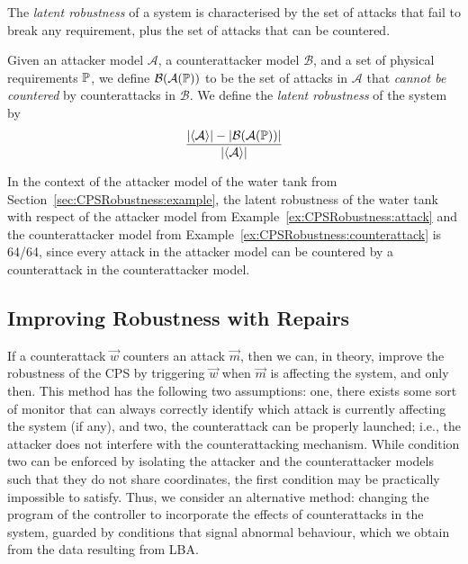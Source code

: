 {{The \emph{latent robustness} of a system is characterised by the set of attacks that fail to break any requirement, plus the set of attacks that can be countered.
\begin{definition}
  \label{def:CPSRobustness:LatentRobustness}
  Given an attacker model $\mathcal{A}$, a counterattacker model $\mathcal{B}$, and a set of physical requirements $\mathbb{P}$, we define $\mathcal{B}(\mathcal{A}(\mathbb{P}))$ to be the set of attacks in $\mathcal{A}$ that \emph{cannot be countered} by counterattacks in $\mathcal{B}$. We define the \emph{latent robustness} of the system by 
  \begin{align*}
    \frac{|{{\left<\mathcal{A}\right>}}|-|\mathcal{B}(\mathcal{A}(\mathbb{P}))|}{|{{\left<\mathcal{A}\right>}}|}
  \end{align*}
\end{definition}
 
\begin{example}
  In the context of the attacker model of the water tank from Section~\ref{sec:CPSRobustness:example}, the latent robustness of the water tank with respect of the attacker model from Example~\ref{ex:CPSRobustness:attack} and the counterattacker model from Example~\ref{ex:CPSRobustness:counterattack} is 64/64, since every attack in the attacker model can be countered by a counterattack in the counterattacker model. 
\end{example}

\subsection{Improving Robustness with Repairs}
\label{sec:CPSRobustness:UrgentAttacker}
If a counterattack $\vec{w}$ counters an attack $\vec{m}$, then we can, in theory, improve the robustness of the CPS by triggering $\vec{w}$ when $\vec{m}$ is affecting the system, and only then. This method has the following two assumptions: one, there exists some sort of monitor that can always correctly identify which attack is currently affecting the system (if any), and two, the counterattack can be properly launched; i.e., the attacker does not interfere with the counterattacking mechanism. While condition two can be enforced by isolating the attacker and the counterattacker models such that they do not share coordinates, the first condition may be practically impossible to satisfy. Thus, we consider an alternative method: changing the program of the controller to incorporate the effects of counterattacks in the system, guarded by conditions that signal abnormal behaviour, which we obtain from the data resulting from LBA.

}}
